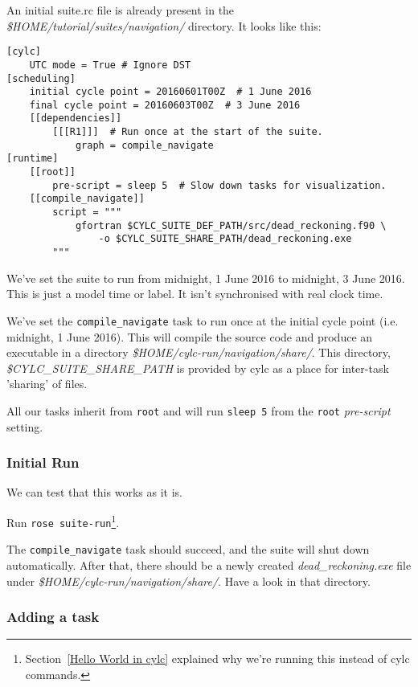 An initial suite.rc file is already present in the {\em \$HOME/tutorial/suites/navigation/} directory.
It looks like this:

\lstset{language=suiterc}
\begin{lstlisting}[columns=fullflexible]
[cylc]
    UTC mode = True # Ignore DST
[scheduling]
    initial cycle point = 20160601T00Z  # 1 June 2016
    final cycle point = 20160603T00Z  # 3 June 2016
    [[dependencies]]
        [[[R1]]]  # Run once at the start of the suite.
            graph = compile_navigate
[runtime]
    [[root]]
        pre-script = sleep 5  # Slow down tasks for visualization.
    [[compile_navigate]]
        script = """
            gfortran $CYLC_SUITE_DEF_PATH/src/dead_reckoning.f90 \
                -o $CYLC_SUITE_SHARE_PATH/dead_reckoning.exe
        """
\end{lstlisting}

    We've set the suite to run from midnight, 1 June 2016 to midnight, 3 June 2016. This is just a model time or label. It isn't synchronised with real clock time.

    We've set the \lstinline{compile_navigate} task to run once at the initial cycle point (i.e. midnight, 1 June 2016). This will compile the source code and produce an executable in a directory {\em \$HOME/cylc-run/navigation/share/}. This directory, {\em \$CYLC\_SUITE\_SHARE\_PATH} is provided by cylc as a place for inter-task 'sharing' of files.

    All our tasks inherit from \lstinline{root} and will run \lstinline{sleep 5} from the \lstinline{root} {\em pre-script} setting.

\subsubsection{Initial Run}

    We can test that this works as it is.
    
    Run \lstinline{rose suite-run}\footnote {Section~\ref{Hello World in cylc} explained why we're running this instead of cylc commands.}.
    
    The \lstinline{compile_navigate} task should succeed, and the suite will shut down automatically. After that, there should be a newly created {\em dead\_reckoning.exe} file under {\em \$HOME/cylc-run/navigation/share/}. Have a look in that directory.

\subsubsection{Adding a task}

